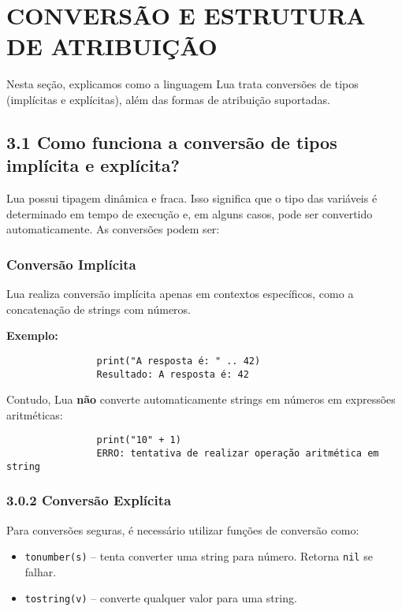 \documentclass[12pt,a4paper]{article}
\begin{document}
			\section{CONVERSÃO E ESTRUTURA DE ATRIBUIÇÃO}
			Nesta seção, explicamos como a linguagem Lua trata conversões de tipos (implícitas e explícitas), além das formas de atribuição suportadas.
			
			\subsection*{3.1 Como funciona a conversão de tipos implícita e explícita?}
			
			Lua possui tipagem dinâmica e fraca. Isso significa que o tipo das variáveis é determinado em tempo de execução e, em alguns casos, pode ser convertido automaticamente. As conversões podem ser:
			
			\subsubsection{Conversão Implícita}
			
			
			Lua realiza conversão implícita apenas em contextos específicos, como a concatenação de strings com números.
			
			\textbf{Exemplo:}
			\begin{verbatim}
				print("A resposta é: " .. 42) 
				Resultado: A resposta é: 42
			\end{verbatim}
			
			Contudo, Lua \textbf{não} converte automaticamente strings em números em expressões aritméticas:
			
			\begin{verbatim}
				print("10" + 1)
				ERRO: tentativa de realizar operação aritmética em string
			\end{verbatim}
			
			
			\subsubsection*{3.0.2 Conversão Explícita}
			
			Para conversões seguras, é necessário utilizar funções de conversão como:
			
			\begin{itemize}
				\item \verb|tonumber(s)| – tenta converter uma string para número. Retorna \verb|nil| se falhar.
				\item \verb|tostring(v)| – converte qualquer valor para uma string.
			\end{itemize}
			
\end{document}

